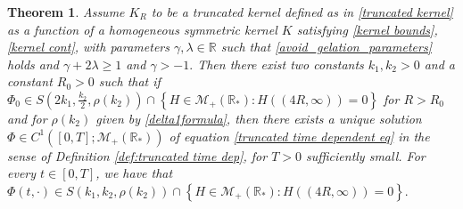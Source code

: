\documentclass[11pt]{article}
\numberwithin{equation}{section}
\theoremstyle{plain}
\newtheorem{theorem}{Theorem}[section]
\begin{document}
\begin{theorem}\label{thm:time dep truncated}
Assume $K_{R}$ to be a truncated kernel defined as in \eqref{truncated kernel} as a function of a homogeneous symmetric kernel $K$ satisfying \eqref{kernel bounds},  \eqref{kernel cont},  with parameters $\gamma, \lambda \in \mathbb R$ such that \eqref{avoid_gelation_parameters} holds and $\gamma + 2\lambda \geq 1 $ and $\gamma > -1.$ 
Then there exist two constants $k_1, k_2>0$ and a constant $R_0>0$ such that if $\Phi_{0} \in S\left(2 k_1 , \frac{k_2}{2} , \rho(k_2)\right) \cap \left\{ H \in \mathcal M_+(\mathbb R_*): H((4R, \infty) )=0 \right\} $ for $R >R_0$ and for $\rho(k_2)$ given by \eqref{delta1formula},
then there exists a unique solution $\Phi \in C^{1}([0,T];\mathcal M_{+}(\mathbb R_*))$ of equation \eqref{truncated time dependent eq} in the sense of Definition \ref{def:truncated time dep}, for $T>0$ sufficiently small.  
For every $ t \in [0, T]$, we have that $\Phi(t, \cdot ) \in S\left(k_1, k_2, \rho( k_2 )\right) \cap \left\{ H \in \mathcal M_+(\mathbb R_*): H((4R, \infty) )=0 \right\}.$ 
\end{theorem}
\end{document}
